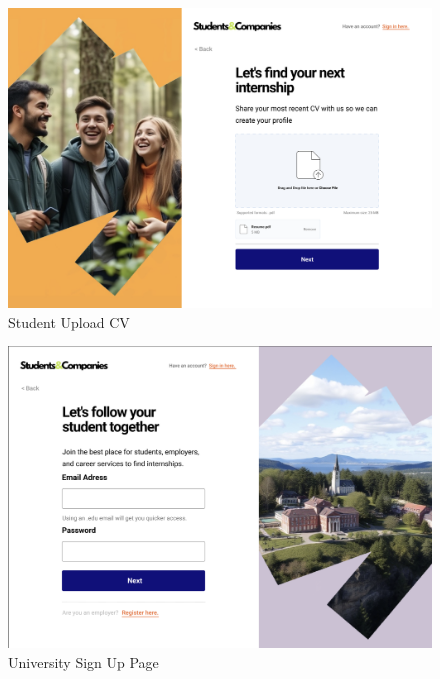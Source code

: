 \documentclass[a4paper,12pt]{article}
\begin{document}
\begin{figure}[H]
    \centering
    \includegraphics[scale = 0.42]{figures/UserInterfaces/General/StudentUploadCV.png}
    \caption{Student Upload CV}
    \centering
\end{figure}
\begin{figure}[H]
    \centering
    \includegraphics[scale = 0.45]{figures/UserInterfaces/General/UniversitySignUp.png}
    \caption{University Sign Up Page}
    \centering
\end{figure}
\end{document}
